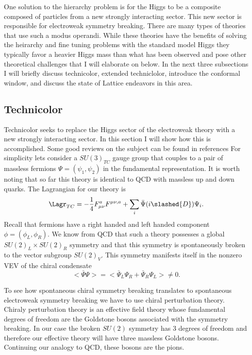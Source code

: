 
One solution to the hierarchy problem is for the Higgs to be a composite composed of particles from a new strongly interacting sector.
This new sector is responsible for electroweak symmetry breaking.
There are many types of theories that use such a modus operandi.
While these theories have the benefits of solving the heirarchy and fine tuning problems with the standard model Higgs they typically favor a heavier Higgs mass than what has been observed and pose other theoretical challenges that I will elaborate on below.
In the next three subsections I will briefly discuss technicolor, extended techniclolor, introduce the conformal window, and discuss the state of Lattice endeavors in this area.

\subsection{Technicolor}

Technicolor seeks to replace the Higgs sector of the electroweak theory with a new strongly interacting sector.
In this section I will show how this is accomplished.
Some good reviews on the subject can be found in references \cite{ds 93-98}
For simplicity lets consider a $SU(3)_{TC}$ gauge group that couples to a pair of massless fermions $\Psi=(\psi_1,\psi_2)$ in the fundamental representation.
It is worth noting that so far this theory is identical to QCD with massless up and down quarks.
The Lagrangian for our theory is
\begin{equation}
  \begin{aligned}
    \Lagr_{TC}=-\frac{1}{4}F^a_{\mu\nu}F^{\mu\nu,a}+\sum_i \bar{\Psi}(i\slashed{D})\Psi_i.
  \end{aligned}
\end{equation}
Recall that fermions have a right handed and left handed component $\phi=(\phi_L,\phi_R)$.
We know from QCD that such a theory possesses a global $SU(2)_L\times SU(2)_R$ symmetry and that this symmetry is spontaneously broken to the vector subgroup $SU(2)_V$.
This symmetry manifests itself in the nonzero VEV of the chiral condensate
\begin{equation}
  <\bar{\Psi}\Psi>=<\bar{\Psi}_L\Psi_R+\bar{\Psi}_R\Psi_L>\neq 0.
\end{equation}

To see how spontaneous chiral symmetry breaking translates to spontaneous electroweak symmetry breaking we have to use chiral perturbation theory.
Chiraly perturbation theory is an effective field theory whose fundamental degrees of freedom are the Goldstone bosons associated with the symmetry breaking.
In our case the broken $SU(2)$ symmetry has 3 degrees of freedom and therefore our effective theory will have three massless Goldstone bosons.
Continuing our analogy to QCD, these bosons are the pions.

